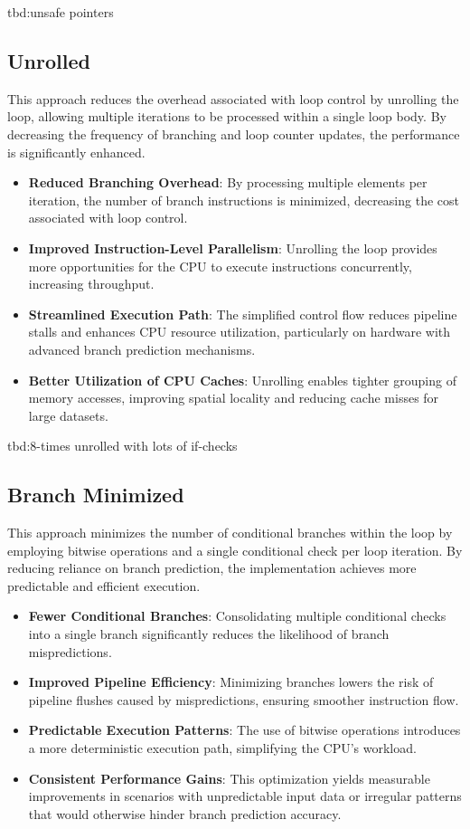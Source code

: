 \documentclass{article}
\begin{document}
tbd:unsafe pointers

\subsection{Unrolled}

This approach reduces the overhead associated with loop control by unrolling the loop, allowing multiple iterations to be processed within a single loop body. By decreasing the frequency of branching and loop counter updates, the performance is significantly enhanced.

\begin{itemize}
  \item \textbf{Reduced Branching Overhead}: By processing multiple elements per iteration, the number of branch instructions is minimized, decreasing the cost associated with loop control.
  \item \textbf{Improved Instruction-Level Parallelism}: Unrolling the loop provides more opportunities for the CPU to execute instructions concurrently, increasing throughput.
  \item \textbf{Streamlined Execution Path}: The simplified control flow reduces pipeline stalls and enhances CPU resource utilization, particularly on hardware with advanced branch prediction mechanisms.
  \item \textbf{Better Utilization of CPU Caches}: Unrolling enables tighter grouping of memory accesses, improving spatial locality and reducing cache misses for large datasets.
\end{itemize}

tbd:8-times unrolled with lots of if-checks

\subsection{Branch Minimized}

This approach minimizes the number of conditional branches within the loop by employing bitwise operations and a single conditional check per loop iteration. By reducing reliance on branch prediction, the implementation achieves more predictable and efficient execution.

\begin{itemize}
  \item \textbf{Fewer Conditional Branches}: Consolidating multiple conditional checks into a single branch significantly reduces the likelihood of branch mispredictions.
  \item \textbf{Improved Pipeline Efficiency}: Minimizing branches lowers the risk of pipeline flushes caused by mispredictions, ensuring smoother instruction flow.
  \item \textbf{Predictable Execution Patterns}: The use of bitwise operations introduces a more deterministic execution path, simplifying the CPU's workload.
  \item \textbf{Consistent Performance Gains}: This optimization yields measurable improvements in scenarios with unpredictable input data or irregular patterns that would otherwise hinder branch prediction accuracy.
\end{itemize}
\end{document}
